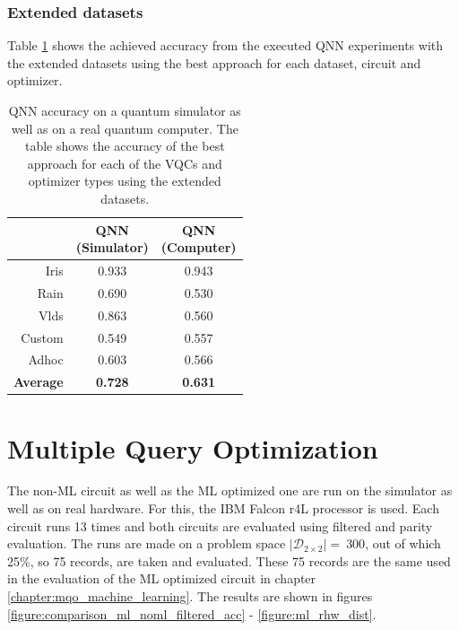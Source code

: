 \subsubsection{Extended datasets}
\label{subsubsection:extended_datasets_comparison}
Table \ref{table:comparison_extended_datasets_accuracy} shows the achieved accuracy from the executed QNN experiments with the extended datasets using the best approach for each dataset, circuit and optimizer. 
\begin{table}[!h]
	\centering
	\begin{tabular}{r|cc}
		\hline 
		\thead{Dataset} & \thead{QNN\\(Simulator)} & \thead{QNN\\(Computer)} \\
		\hline 
		Iris    & 0.933 & 0.943 \\
		Rain    & 0.690 & 0.530 \\
		Vlds    & 0.863 & 0.560 \\
		Custom  & 0.549 & 0.557 \\
		Adhoc   & 0.603 & 0.566 \\
		\hline
		\textbf{Average}  & \textbf{0.728} & \textbf{0.631}  \\
		\hline
	\end{tabular}
	\caption{QNN accuracy on a quantum simulator as well as on a real quantum computer. The table shows the accuracy of the best approach for each of the VQCs and optimizer types using the extended datasets.}
	\label{table:comparison_extended_datasets_accuracy}
\end{table}

\clearpage












\section{Multiple Query Optimization}
\label{chapter:results_mqo}

The non-ML circuit as well as the ML optimized one are run on the simulator as well as on real hardware. For this, the IBM Falcon r4L processor  is used. Each circuit runs 13 times and both circuits are evaluated using filtered and parity evaluation. The runs are made on a problem space $\left|\mathcal{D}_{2\times2}\right| =\ 300$, out of which 25\%, so 75 records, are taken and evaluated. These 75 records are the same used in the evaluation of the ML optimized circuit in chapter \ref{chapter:mqo_machine_learning}. The results are shown in figures \ref{figure:comparison_ml_noml_filtered_acc} - \ref{figure:ml_rhw_dist}.

